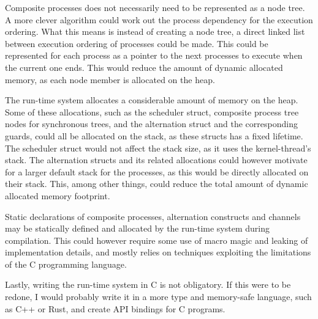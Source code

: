 Composite processes does not necessarily need to be represented as a node tree. A more clever algorithm could work out the process dependency for the execution ordering. What this means is instead of creating a node tree, a direct linked list between execution ordering of processes could be made. This could be represented for each process as a pointer to the next processes to execute when the current one ends. This would reduce the amount of dynamic allocated memory, as each node member is allocated on the heap. 

The run\hyp{}time system allocates a considerable amount of memory on the heap. Some of these allocations, such as the scheduler struct, composite process tree nodes for synchronous trees, and the alternation struct and the corresponding guards, could all be allocated on the stack, as these structs has a fixed lifetime. The scheduler struct would not affect the stack size, as it uses the kernel\hyp{}thread's stack. The alternation structs and its related allocations could however motivate for a larger default stack for the processes, as this would be directly allocated on their stack. This, among other things, could reduce the total amount of dynamic allocated memory footprint.

Static declarations of composite processes, alternation constructs and channels may be statically defined and allocated by the run\hyp{}time system during compilation. This could however require some use of macro magic and leaking of implementation details, and mostly relies on techniques exploiting the limitations of the C programming language.

Lastly, writing the run\hyp{}time system in C is not obligatory. If this were to be redone, I would probably write it in a more type and memory\hyp{}safe language, such as C++ or Rust, and create API bindings for C programs. 

